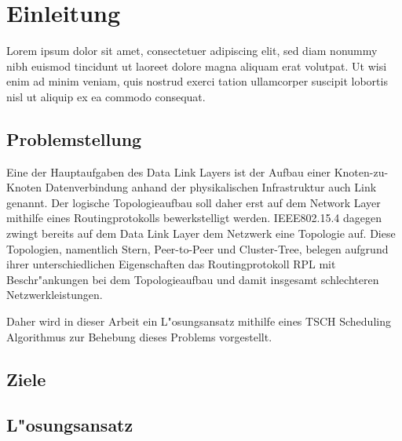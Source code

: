 \section{Einleitung}
\label{sec:einleitung}

Lorem ipsum dolor sit amet, \cite{gof,mde:uml211:07b} consectetuer adipiscing elit,
sed diam nonummy nibh euismod tincidunt ut laoreet dolore magna aliquam erat volutpat.
 Ut wisi enim ad minim veniam, quis nostrud exerci tation ullamcorper suscipit
 lobortis nisl ut aliquip ex ea commodo consequat.


\subsection{Problemstellung}
\label{subsec:einleitung_problemstellung}

Eine der Hauptaufgaben des Data Link Layers ist der Aufbau einer Knoten-zu-Knoten
Datenverbindung anhand der physikalischen Infrastruktur auch Link genannt.
Der logische Topologieaufbau soll daher erst auf dem Network Layer mithilfe
eines Routingprotokolls bewerkstelligt werden. IEEE802.15.4 dagegen zwingt bereits
auf dem Data Link Layer dem Netzwerk eine Topologie auf. Diese Topologien, namentlich
Stern, Peer-to-Peer und Cluster-Tree, belegen aufgrund ihrer unterschiedlichen
Eigenschaften das Routingprotokoll RPL mit Beschr"ankungen bei dem Topologieaufbau
und damit insgesamt schlechteren Netzwerkleistungen.

Daher wird in dieser Arbeit ein L"osungsansatz mithilfe eines TSCH Scheduling Algorithmus
zur Behebung dieses Problems vorgestellt.

\subsection{Ziele}
\label{subsec:einleitung_ziele}

\subsection{L"osungsansatz}
\label{subsec:einleitung_loesungsansatz}

